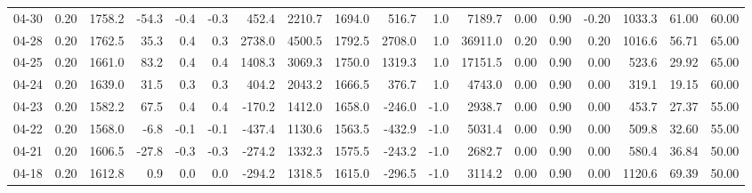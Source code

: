 \begin{threeparttable}
{\begin{tabular}{lrrrrrrrrrrrrrrrrr}
  04-30 &     0.20 & 1758.2 &             -54.3 &              -0.4 &               -0.3 &              452.4 & 2210.7 & 1694.0 &      516.7 &                      1.0 &              7189.7 &       0.00 &      0.90 &          -0.20 &           1033.3 &           61.00 &                  60.00 \\
  04-28 &     0.20 & 1762.5 &              35.3 &               0.4 &                0.3 &             2738.0 & 4500.5 & 1792.5 &     2708.0 &                      1.0 &             36911.0 &       0.20 &      0.90 &           0.20 &           1016.6 &           56.71 &                  65.00 \\
  04-25 &     0.20 & 1661.0 &              83.2 &               0.4 &                0.4 &             1408.3 & 3069.3 & 1750.0 &     1319.3 &                      1.0 &             17151.5 &       0.00 &      0.90 &           0.00 &            523.6 &           29.92 &                  65.00 \\
  04-24 &     0.20 & 1639.0 &              31.5 &               0.3 &                0.3 &              404.2 & 2043.2 & 1666.5 &      376.7 &                      1.0 &              4743.0 &       0.00 &      0.90 &           0.00 &            319.1 &           19.15 &                  60.00 \\
  04-23 &     0.20 & 1582.2 &              67.5 &               0.4 &                0.4 &             -170.2 & 1412.0 & 1658.0 &     -246.0 &                     -1.0 &              2938.7 &       0.00 &      0.90 &           0.00 &            453.7 &           27.37 &                  55.00 \\
  04-22 &     0.20 & 1568.0 &              -6.8 &              -0.1 &               -0.1 &             -437.4 & 1130.6 & 1563.5 &     -432.9 &                     -1.0 &              5031.4 &       0.00 &      0.90 &           0.00 &            509.8 &           32.60 &                  55.00 \\
  04-21 &     0.20 & 1606.5 &             -27.8 &              -0.3 &               -0.3 &             -274.2 & 1332.3 & 1575.5 &     -243.2 &                     -1.0 &              2682.7 &       0.00 &      0.90 &           0.00 &            580.4 &           36.84 &                  50.00 \\
  04-18 &     0.20 & 1612.8 &               0.9 &               0.0 &                0.0 &             -294.2 & 1318.5 & 1615.0 &     -296.5 &                     -1.0 &              3114.2 &       0.00 &      0.90 &           0.00 &           1120.6 &           69.39 &                  50.00 \\

\end{tabular}}
\end{threeparttable}
